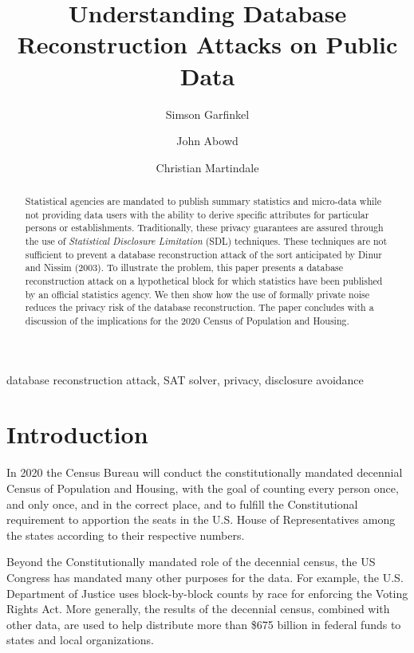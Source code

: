 \documentclass[runningheads]{llncs}
\begin{document}
\title{Understanding Database Reconstruction Attacks on Public Data}
\author{Simson Garfinkel \and John Abowd \and Christian Martindale }

\maketitle
\begin{abstract}
Statistical agencies are mandated to publish summary statistics and
micro-data while not providing data users with the ability to derive
specific attributes for particular persons or
establishments. 
Traditionally, these privacy guarantees are assured through the
use of \emph{Statistical Disclosure Limitation} (SDL)
techniques. These techniques are not sufficient to
prevent a database reconstruction attack of the sort anticipated by
Dinur and Nissim (2003). To illustrate the problem, this paper
presents a database reconstruction attack on a hypothetical block for
which statistics have been published by an official statistics
agency. We then show how the use of formally private noise reduces the
privacy risk of the database reconstruction. The paper concludes with
a discussion of the implications for the 2020 Census of Population and
Housing. 
\end{abstract}

\begin{keywords}
database reconstruction attack, SAT solver, privacy, disclosure avoidance
\end{keywords}

\section{Introduction}
In 2020 the Census Bureau will conduct the constitutionally mandated
decennial Census of Population and Housing, with the goal of counting
every person once, and only once, and in the correct place, and to
fulfill the Constitutional requirement to apportion the seats in the
U.S. House of Representatives among the states according to their
respective numbers.

Beyond the Constitutionally mandated role of the decennial census, the
US Congress has mandated many other purposes for the data. For
example, the U.S. Department of Justice uses block-by-block counts by
race for enforcing the Voting Rights Act. More generally, the results
of the decennial census, combined with other data, are used to help
distribute more than \$675 billion in federal funds to states and
local organizations.
\end{document}
